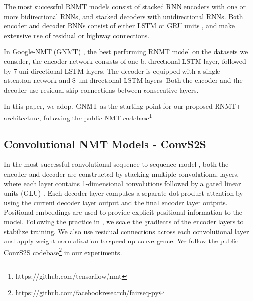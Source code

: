 \documentclass[11pt,a4paper]{article}
\begin{document}
The most successful RNMT models consist of stacked RNN encoders with one or
more bidirectional RNNs, and stacked decoders with unidirectional RNNs. Both
encoder and decoder RNNs consist of either LSTM \cite{hochreiter1997long} or
GRU units \cite{ChoMGBSB14}, and make extensive use of residual
\cite{DBLP:journals/corr/HeZRS15} or highway
\cite{DBLP:journals/corr/SrivastavaGS15} connections.


In Google-NMT (GNMT) \cite{DBLP:journals/corr/WuSCLNMKCGMKSJL16},
the best performing RNMT model on the datasets we consider,
the encoder network consists of one bi-directional LSTM layer, followed by 7
uni-directional LSTM layers. The decoder is equipped with a single attention
network and 8 uni-directional LSTM layers.
Both the encoder and the decoder use residual skip connections between
consecutive layers.

In this paper, we adopt GNMT as the starting point for our proposed RNMT+ architecture,
following the public NMT codebase\footnote{https://github.com/tensorflow/nmt}.







\subsection{Convolutional NMT Models - ConvS2S}

In the most successful convolutional sequence-to-sequence model
\cite{DBLP:journals/corr/GehringAGYD17}, both the encoder and decoder
are constructed by stacking multiple convolutional layers, where each
layer contains 1-dimensional convolutions followed by a gated linear units
(GLU) \cite{DBLP:journals/corr/DauphinFAG16}.
Each decoder layer computes a separate dot-product
attention by using the current decoder layer output and the final encoder layer
outputs. Positional embeddings are used to provide explicit positional information to the model.
Following the practice in \cite{DBLP:journals/corr/GehringAGYD17}, we scale the
gradients of the encoder layers to stabilize training. We also use residual
connections across each convolutional layer and apply weight normalization
\cite{DBLP:journals/corr/SalimansK16} to speed up convergence. We follow
the public ConvS2S codebase\footnote{https://github.com/facebookresearch/fairseq-py} in our experiments.
\end{document}
